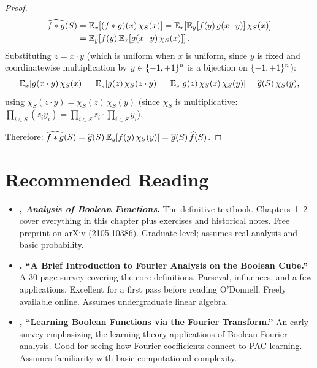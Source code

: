 \begin{proof}
\begin{align*}
  \widehat{f \ast g}(S)
  &= \mathbb{E}_x[(f \ast g)(x)\, \chi_S(x)]
  = \mathbb{E}_x\!\left[\mathbb{E}_y[f(y)\, g(x \cdot y)]\, \chi_S(x)\right] \\
  &= \mathbb{E}_y\!\left[f(y)\, \mathbb{E}_x[g(x \cdot y)\, \chi_S(x)]\right].
\end{align*}
Substituting $z = x \cdot y$ (which is uniform when $x$ is uniform,
since $y$ is fixed and coordinatewise multiplication by $y \in \{-1,+1\}^n$
is a bijection on $\{-1,+1\}^n$):
\[
  \mathbb{E}_x[g(x \cdot y)\, \chi_S(x)]
  = \mathbb{E}_z[g(z)\, \chi_S(z \cdot y)]
  = \mathbb{E}_z[g(z)\, \chi_S(z)\, \chi_S(y)]
  = \widehat{g}(S)\, \chi_S(y),
\]
using $\chi_S(z \cdot y) = \chi_S(z)\,\chi_S(y)$ (since $\chi_S$ is
multiplicative: $\prod_{i \in S}(z_i y_i) = \prod_{i \in S} z_i \cdot \prod_{i \in S} y_i$).

Therefore:
$\widehat{f \ast g}(S) = \widehat{g}(S)\, \mathbb{E}_y[f(y)\, \chi_S(y)] = \widehat{g}(S)\, \widehat{f}(S)$.
\end{proof}


\section*{Recommended Reading}

\begin{itemize}
  \item \textbf{\citet{odonnell2014analysis}, \emph{Analysis of Boolean
    Functions}.}
    The definitive textbook. Chapters~1--2 cover everything in this
    chapter plus exercises and historical notes. Free preprint on arXiv
    (2105.10386). Graduate level; assumes real analysis and basic
    probability.

  \item \textbf{\citet{dewolf2008brief}, ``A Brief Introduction to
    Fourier Analysis on the Boolean Cube.''}
    A 30-page survey covering the core definitions, Parseval, influences,
    and a few applications. Excellent for a first pass before reading
    O'Donnell. Freely available online. Assumes undergraduate
    linear algebra.

  \item \textbf{\citet{mansour1994learning}, ``Learning Boolean Functions
    via the Fourier Transform.''}
    An early survey emphasizing the learning-theory applications of
    Boolean Fourier analysis. Good for seeing how Fourier coefficients
    connect to PAC learning. Assumes familiarity with basic
    computational complexity.
\end{itemize}
